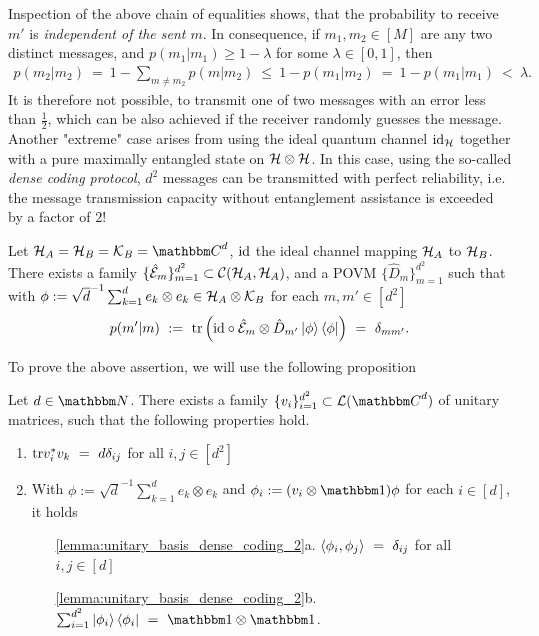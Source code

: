 Inspection of the above chain of equalities shows, that the probability to receive $m'$ is \emph{independent of the sent $m$}. In consequence, if $m_1, m_2 \in [M]$ are any two 
distinct messages, and $p(m_1|m_1) \geq 1 - \lambda$ for some $\lambda \in [0,1]$, then 
\begin{align*}
 p(m_2|m_2) \ = \ 1 - \sum_{m \neq m_2} p(m|m_2) \ \leq \ 1 - p(m_1|m_2) \ = \ 1 - p(m_1|m_1) \ <  \ \lambda.
\end{align*}
It is therefore not possible, to transmit one of two messages with an error less than $\frac{1}{2}$, which can be also achieved if the receiver randomly guesses the message. \\
Another "extreme" case arises from using the ideal quantum channel $\mathrm{id}_{{\mathcal H}}$ together with a pure maximally entangled state on ${\mathcal H} \otimes {\mathcal H}$. In this case, using the so-called \emph{dense coding protocol}, $d^2$ messages can be transmitted with perfect reliability, i.e. the 
message transmission capacity without entanglement assistance is exceeded by a factor of $2$! 
\begin{theorem}\label{thm:dense_coding} 
Let $\cH_A = \cH_B = \cK_B = \bbmC^d$, $\mathrm{id}$ the ideal channel mapping ${\mathcal H}_A$ to ${\mathcal H}_B$. There exists a family
$\{\hat{{\mathcal E}}_{m}\}_{m=1}^{d^2} \subset {\mathcal C}({\mathcal H}_A,{\mathcal H}_A)$, and a POVM $\{\hat{D}_m\}_{m=1}^{d^2}$ such that 
with $\phi := \sqrt{d}^{-1} \sum_{k=1}^{d} e_k \otimes e_k \in {\mathcal H}_A \otimes {\mathcal K}_B$ for each $m,m' \in [d^2]$ 
\begin{align*}
p(m'|m) \ := \ \mathrm{tr} \left(\mathrm{id} \circ\hat{{\mathcal E}}_m \otimes \hat{D}_{m'}\ket{\phi}\bra{\phi}\right) \ = \ \delta_{mm'}.
\end{align*}
\end{theorem}
To prove the above assertion, we will use the following proposition 
%
%
\begin{lemma}\label{lemma:unitary_basis_dense_coding} 
	Let $d \in \bbmN$. There exists a family $\{v_i\}_{i=1}^{d^2} \subset \cL(\bbmC^d)$ of unitary matrices, such that the following properties hold. 
	\begin{enumerate}
		\item $\mathrm{tr} v_i^\ast v_k \ = \ d \delta_{ij}$ for all $i,j \in [d^2]$
		\item With $\phi := \sqrt{d}^{-1} \sum_{k=1}^d e_k \otimes e_k$ and $\phi_i := (v_i\otimes \bbmeins)\phi$ for each $i \in [d]$, it holds  \label{lemma:unitary_basis_dense_coding_2}
		\begin{enumerate}
			\item[\ref{lemma:unitary_basis_dense_coding_2}a.] $\braket{\phi_i, \phi_j}  \ = \ \delta_{ij}$ for all $i,j \in [d]$
			\item[\ref{lemma:unitary_basis_dense_coding_2}b.] $\sum_{i=1}^{d^2} \ket{\phi_i}\bra{\phi_i} \ = \ \bbmeins \otimes \bbmeins$.
		\end{enumerate}
	\end{enumerate}
\end{lemma}
